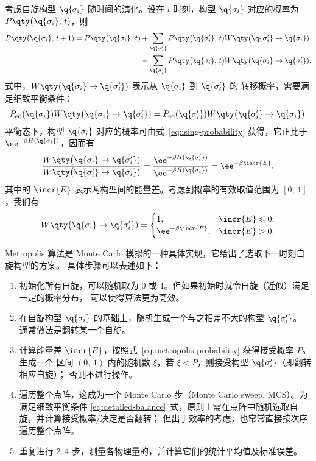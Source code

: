 考虑自旋构型 $\q{\sigma_i}$ 随时间的演化。设在 $t$ 时刻，构型 $\q{\sigma_i}$ 对应的概率为
$P\qty\big(\q{\sigma_i},\,t)$，则
\begin{align}
  P\qty\big(\q{\sigma_i},\,t+1) = P\qty\big(\q{\sigma_i},\,t)
  &+ \sum_{\q{\sigma'_i}} P\qty\big(\q{\sigma'_i},\,t) W\qty\big(\q{\sigma'_i}\to\q{\sigma_i})
     \notag \\
  &- \sum_{\q{\sigma'_i}} P\qty\big(\q{\sigma_i},\,t)  W\qty\big(\q{\sigma_i}\to\q{\sigma'_i}).
\end{align}
式中，$W\qty\big(\q{\sigma_i}\to\q{\sigma'_i})$ 表示从 $\q{\sigma_i}$ 到 $\q{\sigma'_i}$ 的
转移概率，需要满足细致平衡条件：
\begin{equation}
  \label{eq:detailed-balance}
    P_{\text{eq}}(\q{\sigma_i})  W\qty\big(\q{\sigma_i}\to\q{\sigma'_i})
  = P_{\text{eq}}(\q{\sigma'_i}) W\qty\big(\q{\sigma'_i}\to\q{\sigma_i}).
\end{equation}
平衡态下，构型 $\q{\sigma_i}$ 对应的概率可由式~\eqref{eq:ising-probability} 获得，它正比于
$\ee^{-\beta H(\q{\sigma_i})}$，因而有
\begin{equation}
    \frac{W\qty\big(\q{\sigma_i}\to\q{\sigma'_i})}{W\qty\big(\q{\sigma'_i}\to\q{\sigma_i})}
  = \frac{\ee^{-\beta H(\q{\sigma'_i})}}{\ee^{-\beta H(\q{\sigma_i})}}
  = \ee^{-\beta \incr{E}}.
\end{equation}
其中的 $\incr{E}$ 表示两构型间的能量差。考虑到概率的有效取值范围为 $[0,\,1]$，我们有
\begin{equation}
  \label{eq:metropolis-probability}
  W\qty\big(\q{\sigma_i}\to\q{\sigma'_i}) =
  \begin{cases}
    1, & \incr{E} \leqslant 0; \\
    \ee^{-\beta \incr{E}}, & \incr{E} > 0. \\
  \end{cases}
\end{equation}

Metropolis 算法是 Monte Carlo 模拟的一种具体实现，它给出了选取下一时刻自旋构型的方案。
具体步骤可以表述如下：

\begin{enumerate}
  \item 初始化所有自旋，可以随机取为 0 或 1。但如果初始时就令自旋（近似）满足一定的概率分布，
    可以使得算法更为高效。
  \item 在自旋构型 $\q{\sigma_i}$ 的基础上，随机生成一个与之相差不大的构型 $\q{\sigma'_i}$。
    通常做法是翻转某一个自旋。
  \item 计算能量差 $\incr{E}$，按照式~\eqref{eq:metropolis-probability} 获得接受概率 $P$。生成一个
    区间 $(0,\,1)$ 内的随机数 $\xi$，若 $\xi<P$，则接受构型 $\q{\sigma'_i}$（即翻转相应自旋）；
    否则不进行操作。
  \item 遍历整个点阵，这成为一个 Monte Carlo 步（Monte Carlo sweep, MCS）。为满足细致平衡条件
    \eqref{eq:detailed-balance}~式，原则上需在点阵中随机选取自旋，并计算接受概率/决定是否翻转；
    但出于效率的考虑，也常常直接按次序遍历整个点阵。
  \item 重复进行 2--4 步，测量各物理量的，并计算它们的统计平均值及标准误差。
\end{enumerate}

